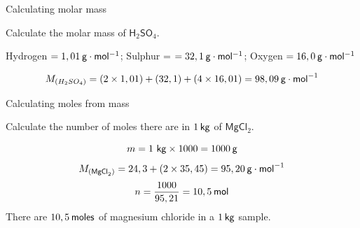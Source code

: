       \begin{wex}{Calculating molar mass }{
      \label{m38717*probfhsst!!!underscore!!!id567}
      \label{m38717*id278505}Calculate the molar mass of $\mathsf{H}{}_{2}\mathsf{SO}{}_{4}$.\par 
      \vspace{5pt}}
{
      \label{m38717*id278575}Hydrogen $=1,01\phantom{\rule{2pt}{0ex}}\mathsf{g}\ensuremath{\cdot}\mathsf{mol}{}^{-1}$; Sulphur = $=32,1\phantom{\rule{2pt}{0ex}}\mathsf{g}\ensuremath{\cdot}\mathsf{mol}{}^{-1}$; Oxygen $=16,0\phantom{\rule{2pt}{0ex}}\mathsf{g}\ensuremath{\cdot}\mathsf{mol}{}^{-1}$\par 
      \label{m38717*id278632}\nopagebreak\noindent{}
    \begin{equation*}
    {M}_{\left({H}_{2}S{O}_{4}\right)}=\left(2\ensuremath{\times}1,01\right)+\left(32,1\right)+\left(4\ensuremath{\times}16,01\right)=98,09\phantom{\rule{2pt}{0ex}}\mathsf{g}\ensuremath{\cdot}{\mathsf{mol}}^{-1}
      \end{equation*}
}
    \end{wex}
    \noindent
  \vspace{-.3cm}
\par
            \label{m38717*secfhsst!!!underscore!!!id641}\vspace{.5cm}  
      \begin{wex}{Calculating moles from mass }
{
      \label{m38717*id278755}Calculate the number of moles there are in $1\phantom{\rule{2pt}{0ex}}\mathsf{kg}$ of $\mathsf{MgCl}{}_{2}$.\par 
      \vspace{5pt}}
{


\label{m38717*id278854}\nopagebreak\noindent{}
    \begin{equation*}
    m=1~\mathsf{kg}\ensuremath{\times}1 000=1 000\phantom{\rule{2pt}{0ex}}\mathsf{g}
      \end{equation*}
\label{m38717*id278912}\nopagebreak\noindent{}
    \begin{equation*}
    {M}_{\left({\mathsf{MgCl}}_{2}\right)}=24,3 + \left(2\ensuremath{\times}35,45\right) = 95,20\phantom{\rule{2pt}{0ex}}\mathsf{g}\ensuremath{\cdot}{\mathsf{mol}}^{-1}
      \end{equation*}    
      \label{m38717*id279005}\nopagebreak\noindent{}
    \begin{equation*}
    n=\frac{1000}{95,21}=10,5\phantom{\rule{2pt}{0ex}}\mathsf{mol}
      \end{equation*}
      \label{m38717*id279046}There are $10,5\phantom{\rule{2pt}{0ex}}\mathsf{moles}$ of magnesium chloride in a $1\phantom{\rule{2pt}{0ex}}\mathsf{kg}$ sample.\par 
}
    \end{wex}
